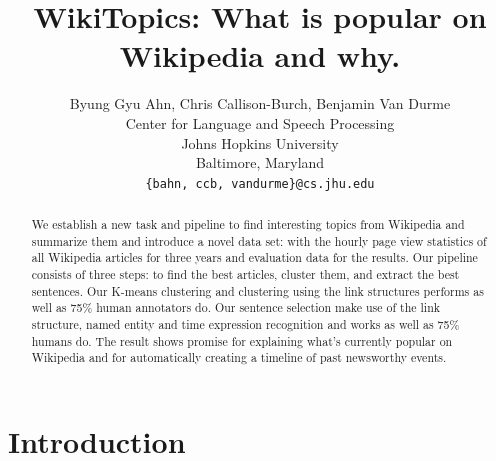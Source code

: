 \documentclass[11pt]{article}
\title{WikiTopics: What is popular on Wikipedia and why.}
\author{Byung Gyu Ahn, Chris Callison-Burch, Benjamin Van Durme \\
  Center for Language and Speech Processing \\
  Johns Hopkins University \\
  Baltimore, Maryland \\
  {\tt \{bahn, ccb, vandurme\}@cs.jhu.edu} \\}
\date{}
\begin{document}
\maketitle
\begin{abstract}
We establish a new task and pipeline to find interesting topics from Wikipedia and summarize them and introduce a novel data set:
with the hourly page view statistics of all Wikipedia articles for three years and evaluation data for the results.
Our pipeline consists of three steps: to find the best articles, cluster them, and extract the best sentences.
Our K-means clustering and clustering using the link structures performs as well as 75\% human annotators do.
Our sentence selection make use of the link structure, named entity and time expression recognition and works as well as 75\% humans do.  
The result shows promise for explaining what's currently popular on Wikipedia and for automatically creating a timeline of past newsworthy events.

\end{abstract}

\section{Introduction}





\end{document}
